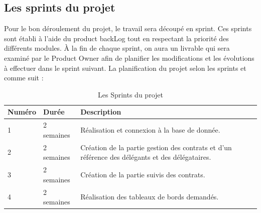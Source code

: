 \documentclass[a4paper]{report}
\begin{document}
\begin{doublespace}
	\subsection{Les sprints du projet}
	Pour le bon déroulement du projet, le travail sera découpé en sprint. Ces sprints sont établi à l’aide du product backLog tout en respectant la priorité des différents modules. À la fin de chaque sprint, on aura un livrable qui sera examiné par le Product Owner afin de planifier les modifications et les évolutions à effectuer dans le sprint suivant. La planification du projet selon les sprints et comme suit :
	\begin{table}[H]
		\begin{center}
			\begin{tabularx}{17.5cm}{|p{2cm}|p{2cm}|X|}
				\hline
				\textbf{Numéro} & \textbf{Durée} & \textbf{Description}                                                                            \\
				\hline
				1               & 2 semaines     & Réalisation et connexion à la base de donnée.                                                   \\
				\hline
				2               & 2 semaines     & Création de la partie gestion des contrats et d'un référence des délégants et des délégataires. \\
				\hline
				3               & 2 semaines     & Création de la partie suivis des contrats.                                                      \\
				\hline
				4               & 2 semaines     & Réalisation des tableaux de bords demandés.                                                     \\
				\hline
			\end{tabularx}
			\caption{Les Sprints du projet}
		\end{center}
	\end{table}

\end{doublespace}
\end{document}

